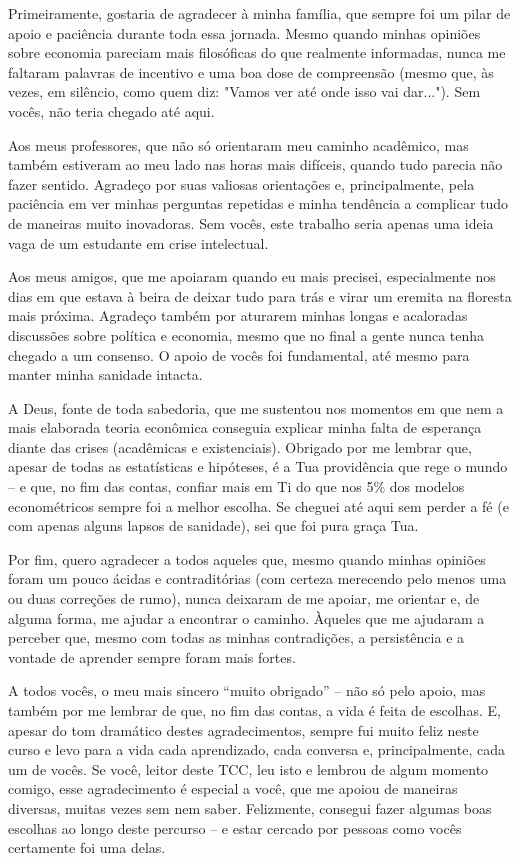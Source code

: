 \begin{agradecimentos}
    Primeiramente, gostaria de agradecer à minha família, que sempre foi um pilar de apoio e paciência durante toda essa jornada. Mesmo quando minhas opiniões sobre economia pareciam mais filosóficas do que realmente informadas, nunca me faltaram palavras de incentivo e uma boa dose de compreensão (mesmo que, às vezes, em silêncio, como quem diz: "Vamos ver até onde isso vai dar..."). Sem vocês, não teria chegado até aqui.

    Aos meus professores, que não só orientaram meu caminho acadêmico, mas também estiveram ao meu lado nas horas mais difíceis, quando tudo parecia não fazer sentido. Agradeço por suas valiosas orientações e, principalmente, pela paciência em ver minhas perguntas repetidas e minha tendência a complicar tudo de maneiras muito inovadoras. Sem vocês, este trabalho seria apenas uma ideia vaga de um estudante em crise intelectual.
    
    Aos meus amigos, que me apoiaram quando eu mais precisei, especialmente nos dias em que estava à beira de deixar tudo para trás e virar um eremita na floresta mais próxima. Agradeço também por aturarem minhas longas e acaloradas discussões sobre política e economia, mesmo que no final a gente nunca tenha chegado a um consenso. O apoio de vocês foi fundamental, até mesmo para manter minha sanidade intacta.

    A Deus, fonte de toda sabedoria, que me sustentou nos momentos em que nem a mais elaborada teoria econômica conseguia explicar minha falta de esperança diante das crises (acadêmicas e existenciais). Obrigado por me lembrar que, apesar de todas as estatísticas e hipóteses, é a Tua providência que rege o mundo – e que, no fim das contas, confiar mais em Ti do que nos 5\% dos modelos econométricos sempre foi a melhor escolha. Se cheguei até aqui sem perder a fé (e com apenas alguns lapsos de sanidade), sei que foi pura graça Tua.
    
    Por fim, quero agradecer a todos aqueles que, mesmo quando minhas opiniões foram um pouco ácidas e contraditórias (com certeza merecendo pelo menos uma ou duas correções de rumo), nunca deixaram de me apoiar, me orientar e, de alguma forma, me ajudar a encontrar o caminho. Àqueles que me ajudaram a perceber que, mesmo com todas as minhas contradições, a persistência e a vontade de aprender sempre foram mais fortes.

    A todos vocês, o meu mais sincero “muito obrigado” – não só pelo apoio, mas também por me lembrar de que, no fim das contas, a vida é feita de escolhas. E, apesar do tom dramático destes agradecimentos, sempre fui muito feliz neste curso e levo para a vida cada aprendizado, cada conversa e, principalmente, cada um de vocês. Se você, leitor deste TCC, leu isto e lembrou de algum momento comigo, esse agradecimento é especial a você, que me apoiou de maneiras diversas, muitas vezes sem nem saber. Felizmente, consegui fazer algumas boas escolhas ao longo deste percurso – e estar cercado por pessoas como vocês certamente foi uma delas.


\end{agradecimentos}
